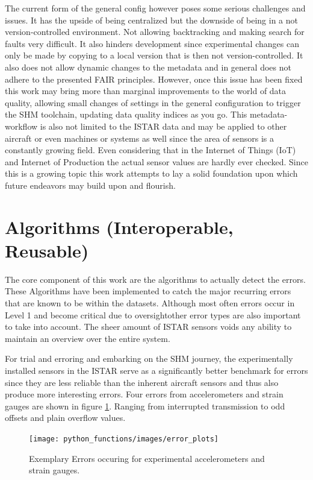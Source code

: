 The current form of the general config however poses some serious challenges and issues. It has the upside of being centralized but the downside of being in a not version-controlled environment. Not allowing backtracking and making search for faults very difficult. It also hinders development since experimental changes can only be made by copying to a local version that is then not version-controlled. It also does not allow dynamic changes to the metadata and in general does not adhere to the presented FAIR principles. However, once this issue has been fixed this work may bring more than marginal improvements to the world of data quality, allowing small changes of settings in the general configuration to trigger the SHM toolchain, updating data quality indices as you go. This metadata-workflow is also not limited to the  ISTAR data and may be applied to other aircraft or even machines or systems as well since the area of sensors is a constantly growing field. Even considering that in the Internet of Things (IoT) and Internet of Production the actual sensor values are hardly ever checked. Since this is a growing topic this work attempts to lay a solid foundation upon which future endeavors may build upon and flourish.


\section{Algorithms (Interoperable, Reusable)}

The core component of this work are the algorithms to actually detect the errors. These Algorithms have been implemented to catch the major recurring errors that are known to be within the datasets. Although most often errors occur in Level 1 and become critical due to oversightother error types are also important to take into account. The sheer amount of ISTAR sensors voids any ability to maintain an overview over the entire system.

For trial and erroring and embarking on the SHM journey, the experimentally installed sensors in the ISTAR serve as a significantly better benchmark for errors since they are less reliable than the inherent aircraft sensors and thus also produce more interesting errors. Four errors from accelerometers and strain gauges are shown in figure \ref{fig:error_plots}. Ranging from interrupted transmission to odd offsets and plain overflow values.

\begin{figure}[h]
    \centering
    \texttt{[image: python\_functions/images/error\_plots]}
    \caption{Exemplary Errors occuring for experimental accelerometers and strain gauges.}
    \label{fig:error_plots}
\end{figure}



